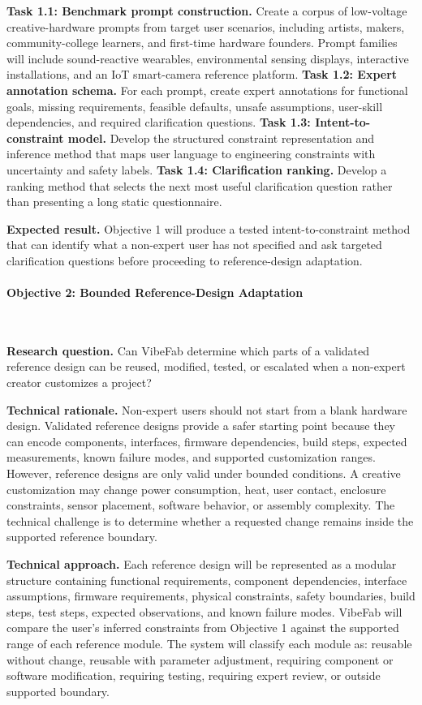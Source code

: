 \textbf{Task 1.1: Benchmark prompt construction.} Create a corpus of low-voltage creative-hardware prompts from target user scenarios, including artists, makers, community-college learners, and first-time hardware founders. Prompt families will include sound-reactive wearables, environmental sensing displays, interactive installations, and an IoT smart-camera reference platform.
\textbf{Task 1.2: Expert annotation schema.} For each prompt, create expert annotations for functional goals, missing requirements, feasible defaults, unsafe assumptions, user-skill dependencies, and required clarification questions.
\textbf{Task 1.3: Intent-to-constraint model.} Develop the structured constraint representation and inference method that maps user language to engineering constraints with uncertainty and safety labels.
\textbf{Task 1.4: Clarification ranking.} Develop a ranking method that selects the next most useful clarification question rather than presenting a long static questionnaire.

\textbf{Expected result.} Objective 1 will produce a tested intent-to-constraint method that can identify what a non-expert user has not specified and ask targeted clarification questions before proceeding to reference-design adaptation.

\vspace{-10pt}
\paragraph{Objective 2: Bounded Reference-Design Adaptation}~{}

\textbf{Research question.} Can VibeFab determine which parts of a validated reference design can be reused, modified, tested, or escalated when a non-expert creator customizes a project?

\textbf{Technical rationale.} Non-expert users should not start from a blank hardware design. Validated reference designs provide a safer starting point because they can encode components, interfaces, firmware dependencies, build steps, expected measurements, known failure modes, and supported customization ranges. However, reference designs are only valid under bounded conditions. A creative customization may change power consumption, heat, user contact, enclosure constraints, sensor placement, software behavior, or assembly complexity. The technical challenge is to determine whether a requested change remains inside the supported reference boundary.

\textbf{Technical approach.} Each reference design will be represented as a modular structure containing functional requirements, component dependencies, interface assumptions, firmware requirements, physical constraints, safety boundaries, build steps, test steps, expected observations, and known failure modes. VibeFab will compare the user's inferred constraints from Objective 1 against the supported range of each reference module. The system will classify each module as: reusable without change, reusable with parameter adjustment, requiring component or software modification, requiring testing, requiring expert review, or outside supported boundary.

